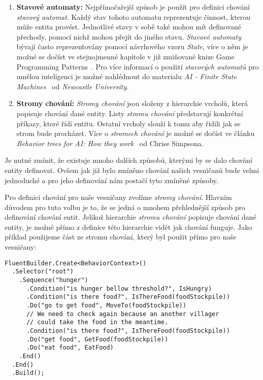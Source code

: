 \begin{enumerate}
    \item \textbf{Stavové automaty:} Nejpřímočařejší způsob je použít pro definici chování \textit{stavový automat}. Každý stav tohoto automatu reprezentuje činnost, kterou může entita provést. Jednotlivé stavy v sobě také mohou mít definované přechody, pomocí nichž mohou přejít do jiného stavu. \textit{Stavové automaty} bývají často reprezentovány pomocí návrhového vzoru \textit{State}, více o něm je možné se dočíst ve stejnojmenné kapitole v již zmiňované knize Game Programming Patterns~\cite{nystrom2014game}. Pro více informací o použití \textit{stavových automatů} pro umělou inteligenci je možné nahlédnout do materialu \textit{AI - Finite State Machines}~\cite{AIStateMachines} od \textit{Newcastle University}.
    
    \item \textbf{Stromy chování:} \textit{Stromy chování} jsou složeny z hierarchie vrcholů, která popisuje chování dané entity. Listy \textit{stromu chování} představují konkrétní příkazy, které řídí entitu. Ostatní vrcholy slouží k tomu aby řídili jak se strom bude procházet. Více o \textit{stromech chování} je možné se dočíst ve článku \textit{Behavior trees for AI: How they work}~\cite{BehaviorTrees} od Chrise Simpsona.
\end{enumerate}

Je nutné zmínit, že existuje mnoho dalších způsobů, kterými by se dalo chování entity definovat. Ovšem jak již bylo zmíněno chování našich vesničanů bude velmi jednoduché a pro jeho definování nám postačí tyto zmíněné způsoby.

Pro definici chování pro naše vesničany zvolíme \textit{stromy chování}. Hlavním důvodem pro tuto volbu je to, že se jedná o mnohem přehlednější způsob pro definování chování entit. Jelikož hierarchie \textit{stromu chování} popisuje chování dané entity, je možné přímo z definice této hierarchie vidět jak chování funguje. Jako příklad použijeme část ze stromu chování, který byl použit přímo pro naše vesničany:

\begin{verbatim}
FluentBuilder.Create<BehaviorContext>()
  .Selector("root")
    .Sequence("hunger")
      .Condition("is hunger bellow threshold?", IsHungry)
      .Condition("is there food?", IsThereFood(foodStockpile))
      .Do("go to get food", MoveTo(foodStockpile))
      // We need to check again because an another villager
      // could take the food in the meantime.
      .Condition("is there food?", IsThereFood(foodStockpile))
      .Do("get food", GetFood(foodStockpile))
      .Do("eat food", EatFood)
    .End()
  .End()
  .Build();
\end{verbatim}

